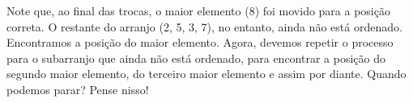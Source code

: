 \documentclass[a4paper, 11pt]{article}
\begin{document}
\begin{enumerate}
\begin{center}
\end{center}

Note que, ao final das trocas, o maior elemento (8) foi movido para a posição
 correta.  O restante do arranjo (2, 5, 3, 7), no entanto, ainda não está
 ordenado. Encontramos a posição do maior elemento. Agora, devemos repetir o
 processo para o subarranjo que ainda não está ordenado, para encontrar a
 posição do segundo maior elemento, do terceiro maior elemento e assim por
 diante. Quando podemos parar? Pense nisso!
\end{enumerate}
\end{document}
